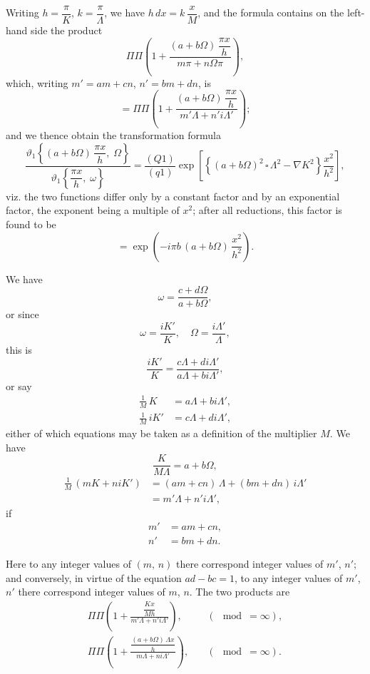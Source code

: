 \documentclass[11pt,a4paper]{book}
\begin{document}
Writing $h = \dfrac{\pi}{K}$, $k = \dfrac{\pi}{\Lambda}$, we have $h\,dx = k\,\dfrac{x}{M}$, and the formula contains on the left-hand side the product
\[
\Pi\Pi\left(1 + \frac{(a+b\Omega)\,\dfrac{\pi x}{h}}{m\pi + n\Omega\pi}\right),
\]
which, writing $m' = am + cn$, $n' = bm + dn$, is
\[
= \Pi\Pi\left(1 + \frac{(a+b\Omega)\,\dfrac{\pi x}{h}}{m'\Lambda + n'i\Lambda'}\right);
\]
and we thence obtain the transformation formula
\[
\frac{\vartheta_1\left\{(a+b\Omega)\,\dfrac{\pi x}{h},\;\Omega\right\}}{\vartheta_1\left\{\dfrac{\pi x}{h},\;\omega\right\}} = \frac{(Q1)}{(q1)} \exp\left[\left\{(a+b\Omega)^2\,\square\,\Lambda^2 - \nabla K^2\right\}\frac{x^2}{h^2}\right],
\]
viz. the two functions differ only by a constant factor and by an exponential factor, the exponent being a multiple of $x^2$; after all reductions, this factor is found to be
\[
= \exp\left(-i\pi b\,(a+b\Omega)\,\frac{x^2}{h^2}\right).
\]

We have
\[
\omega = \frac{c+d\Omega}{a+b\Omega},
\]
or since
\[
\omega = \frac{iK'}{K},\quad \Omega = \frac{i\Lambda'}{\Lambda},
\]
this is
\[
\frac{iK'}{K} = \frac{c\Lambda + di\Lambda'}{a\Lambda + bi\Lambda'},
\]
or say
\begin{align*}
\frac{1}{M}\,K &= a\Lambda + bi\Lambda',\\
\frac{1}{M}\,iK' &= c\Lambda + di\Lambda',
\end{align*}
either of which equations may be taken as a definition of the multiplier $M$. We have
\[
\frac{K}{M\Lambda} = a + b\Omega,
\]
\begin{align*}
\frac{1}{M}\,(mK + niK') &= (am+cn)\,\Lambda + (bm+dn)\,i\Lambda'\\
&= m'\Lambda + n'i\Lambda',
\end{align*}
if
\begin{align*}
m' &= am + cn,\\
n' &= bm + dn.
\end{align*}

Here to any integer values of $(m,\,n)$ there correspond integer values of $m'$, $n'$; and conversely, in virtue of the equation $ad-bc=1$, to any integer values of $m'$, $n'$ there correspond integer values of $m$, $n$. The two products are
\begin{align*}
\Pi\Pi\left(1 + \frac{\dfrac{Kx}{Mh}}{m'\Lambda + n'i\Lambda'}\right),\quad &(\mod = \infty),\\
\Pi\Pi\left(1 + \frac{\dfrac{(a+b\Omega)\,\Lambda x}{h}}{m\Lambda + ni\Lambda'}\right),\quad &(\mod = \infty).
\end{align*}
\end{document}
